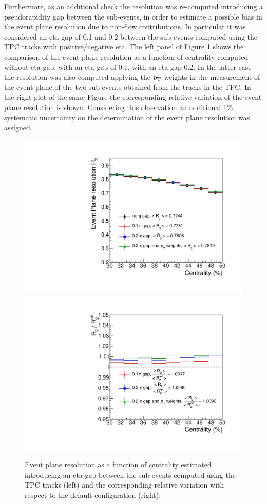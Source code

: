Furthermore, as an additional check the resolution was re-computed introducing 
a pseudorapidity gap between the sub-events, in order to estimate a possible bias 
in the event plane resolution due to non-flow contributions. In particular it was considered an eta 
gap of 0.1 and 0.2 between the sub-events computed using the TPC tracks with positive/negative 
eta. The left panel of Figure \ref{fig:EtaGapSyst} shows the comparison of the event plane resolution
as a function of centrality computed without eta gap, with an eta gap of 0.1, with an eta gap 0.2. 
In the latter case the resolution was also computed applying the $p_{\rm T}$ weights in the measurement of
the event plane of the two sub-events obtained from the tracks in the TPC.
In the right plot of the same Figure the corresponding relative variation of the event plane resolution is shown.
Considering this observation an additional 1\% systematic uncertainty on the determination of the
event plane resolution was assigned.

\begin{figure}
\centering
  \includegraphics[width=.45\textwidth]{FigCap5/EPresolution_VZERO_NonFlowSyst.pdf}
  \includegraphics[width=.45\textwidth]{FigCap5/EPresolution_VZERO_NonFlowSyst_ratio.pdf}
\caption{Event plane resolution as a function of centrality estimated introducing an eta gap between the sub-events computed using the TPC tracks (left) and the corresponding relative variation with respect to the default configuration (right).}
\label{fig:EtaGapSyst}
\end{figure}

